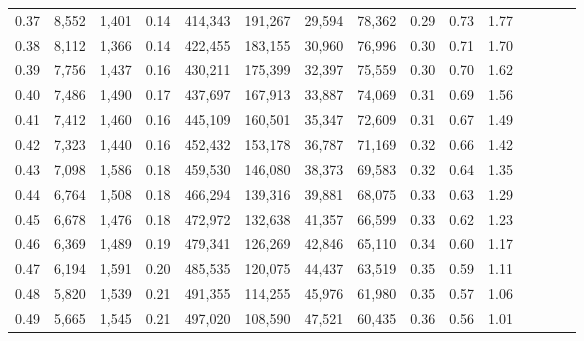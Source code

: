 \begin{tabular}{rrrcrrrrrrrrrrr}
0.37 &   8,552 &   1,401 &                                       0.14 &  414,343 &  191,267 &   29,594 &   78,362 &  0.29 &  0.73 &                         1.77 \\
0.38 &   8,112 &   1,366 &                                       0.14 &  422,455 &  183,155 &   30,960 &   76,996 &  0.30 &  0.71 &                         1.70 \\
0.39 &   7,756 &   1,437 &                                       0.16 &  430,211 &  175,399 &   32,397 &   75,559 &  0.30 &  0.70 &                         1.62 \\
0.40 &   7,486 &   1,490 &                                       0.17 &  437,697 &  167,913 &   33,887 &   74,069 &  0.31 &  0.69 &                         1.56 \\
0.41 &   7,412 &   1,460 &                                       0.16 &  445,109 &  160,501 &   35,347 &   72,609 &  0.31 &  0.67 &                         1.49 \\
0.42 &   7,323 &   1,440 &                                       0.16 &  452,432 &  153,178 &   36,787 &   71,169 &  0.32 &  0.66 &                         1.42 \\
0.43 &   7,098 &   1,586 &                                       0.18 &  459,530 &  146,080 &   38,373 &   69,583 &  0.32 &  0.64 &                         1.35 \\
0.44 &   6,764 &   1,508 &                                       0.18 &  466,294 &  139,316 &   39,881 &   68,075 &  0.33 &  0.63 &                         1.29 \\
0.45 &   6,678 &   1,476 &                                       0.18 &  472,972 &  132,638 &   41,357 &   66,599 &  0.33 &  0.62 &                         1.23 \\
0.46 &   6,369 &   1,489 &                                       0.19 &  479,341 &  126,269 &   42,846 &   65,110 &  0.34 &  0.60 &                         1.17 \\
0.47 &   6,194 &   1,591 &                                       0.20 &  485,535 &  120,075 &   44,437 &   63,519 &  0.35 &  0.59 &                         1.11 \\
0.48 &   5,820 &   1,539 &                                       0.21 &  491,355 &  114,255 &   45,976 &   61,980 &  0.35 &  0.57 &                         1.06 \\
0.49 &   5,665 &   1,545 &                                       0.21 &  497,020 &  108,590 &   47,521 &   60,435 &  0.36 &  0.56 &                         1.01 \\

\end{tabular}
